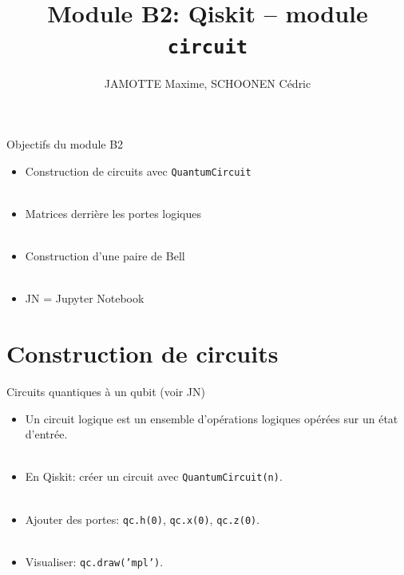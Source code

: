\documentclass[aspectratio=169,12pt]{beamer}
\title[Module B2]{Module B2: Qiskit -- module \texttt{circuit}}
\author{JAMOTTE Maxime, SCHOONEN Cédric}
\institute{Digital Learning Hub}
\date{}
\begin{document}
\begin{frame}
  \titlepage
\end{frame}

\begin{frame}{Objectifs du module B2}
  \begin{itemize}
    \item Construction de circuits avec \texttt{QuantumCircuit}\\~\\
    \item Matrices derrière les portes logiques\\~\\
    \item Construction d'une paire de Bell\\~\\
    \item JN = Jupyter Notebook
  \end{itemize}
\end{frame}

\section{Construction de circuits}

\begin{frame}{Circuits quantiques à un qubit (voir JN)}
  \begin{itemize}
    \item Un circuit logique est un ensemble d'opérations logiques opérées sur un état d'entrée.\\~\\
    \item En Qiskit: créer un circuit avec \texttt{QuantumCircuit(n)}.\\~\\
    \item Ajouter des portes: \texttt{qc.h(0)}, \texttt{qc.x(0)}, \texttt{qc.z(0)}.\\~\\
    \item Visualiser: \texttt{qc.draw('mpl')}.
  \end{itemize}
\end{frame}
\end{document}
